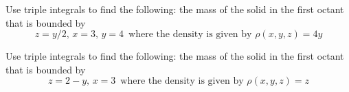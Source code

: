 \documentclass[12pt,letterpaper]{hmcpset}
\begin{document}
\begin{problem}[5.a]

	Use triple integrals to find the following:
	the mass of the solid in the first octant that is bounded by
	\[
		z = y/2\text{, } x =3\text{, } y=4 \,\,\,\text{where the density is given by } \rho(x,y,z) = 4y
	\]
\end{problem}

\begin{solution}

\end{solution}

\begin{problem}[5.b]

	Use triple integrals to find the following:
	the mass of the solid in the first octant that is bounded by
	\[
		z = 2-y\text{, } x =3 \,\,\,\text{where the density is given by } \rho(x,y,z) = z
	\]
\end{problem}

\begin{solution}
\end{solution}
\end{document}
